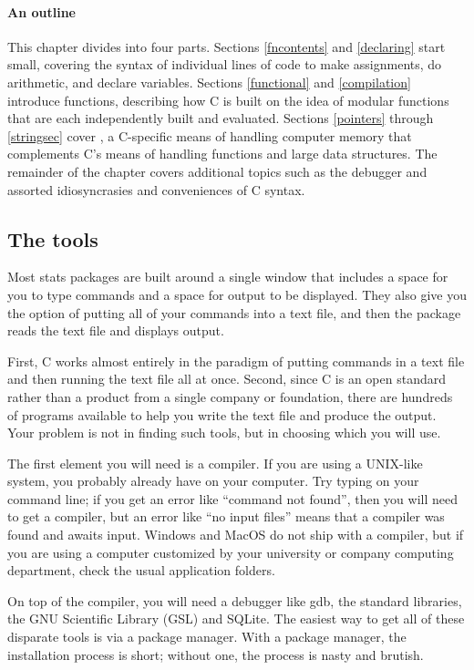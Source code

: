 \paragraph{An outline} 

This chapter divides into four parts.  Sections \ref{fncontents} and
\ref{declaring} start small, covering the syntax of individual lines
of code to make assignments, do arithmetic, and declare variables.
Sections \ref{functional} and \ref{compilation} introduce functions,
describing how C is built on the idea of modular functions that are each
independently built and evaluated.  Sections \ref{pointers} through
\ref{stringsec} cover , a C-specific means of handling
computer memory that complements C's means of handling functions and
large data structures. The remainder of the chapter covers additional
topics such as the debugger and assorted idiosyncrasies and conveniences
of C syntax.

\subsection{The tools} 
Most stats packages are built around a single window that includes a
space for you to type commands and a space for output to be displayed.
They also give you the option of putting all of your commands into a
text file, and then the package reads the text file and displays output.

First, C works almost entirely in the paradigm of putting commands in a
text file and then running the text file all at once. Second, since
C is an open standard rather than a product from a single company or
foundation, there
are hundreds of programs available to help you write the text file and
produce the output. Your problem is not in finding such tools, but in
choosing which you will use.

The first element you will need is a compiler. If you are using
a UNIX-like system, you probably already have  on your
computer. Try typing  on your command line; if you get an
error like ``command not found'', then you will need to get a compiler,
but an error like ``no input files'' means that a compiler was found
and awaits input. Windows and MacOS do not ship with a compiler, but if you
are using a computer customized by your university or company computing
department, check the usual application folders.

On top of the compiler, you will need a debugger like gdb, the standard
libraries, the GNU Scientific Library (GSL) and SQLite.  The easiest way
to get all of these disparate tools is via a package manager. With a
package manager, the installation process is short; without one,
the process is nasty and brutish.

